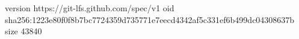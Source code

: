 version https://git-lfs.github.com/spec/v1
oid sha256:1223e80f0f8b7bc7724359d735771e7eecd4342af5c331ef6b499dc04308637b
size 43840
